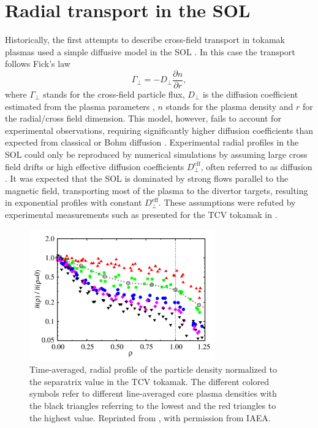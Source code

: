 \section{Radial transport in the SOL}
 Historically, the first attempts to describe cross-field transport in tokamak plasmas used
 a simple diffusive model in the SOL \cite{connor1999comparison}. In this case the transport follows Fick's law
 \begin{equation}
 	\Gamma_\perp = - D_\perp \frac{\partial n}{\partial r},
 \end{equation}
where $\Gamma_\perp$ stands for the cross-field particle flux, $D_\perp$ is the diffusion coefficient estimated from the plasma parameters \cite{Bohm1949}, $n$ stands for the plasma density and $r$ for the radial/cross field dimension. This model, however, fails to account for experimental observations, requiring significantly higher diffusion coefficients than expected from classical or Bohm diffusion \cite{lipschultz2002investigation,krasheninnikov2008recent}. Experimental radial profiles in the SOL could only be reproduced by numerical simulations by assuming large cross field drifts or high effective diffusion coefficients $D_\perp^\textrm{eff}$, often referred to as  diffusion \cite{wesson2011tokamaks}. It was expected that the SOL is dominated by strong flows parallel to the magnetic field, transporting most of the plasma to the divertor targets, resulting in exponential profiles with constant $D_\perp^\textrm{eff}$. These assumptions were refuted by experimental measurements such as presented for the TCV tokamak in .
  \begin{figure}[t]
	\centering
	\includegraphics[width=8cm]{figures/garcia_fluc.png}
	\caption{Time-averaged, radial profile of the particle density normalized to the separatrix value in the TCV tokamak. The different colored symbols refer to different line-averaged core plasma densities with the black triangles referring to the lowest and the red triangles to the highest value. Reprinted from \cite{garcia2007fluctuations}, with permission from IAEA.}
	\label{Fig:garcia_fluc}
\end{figure}
